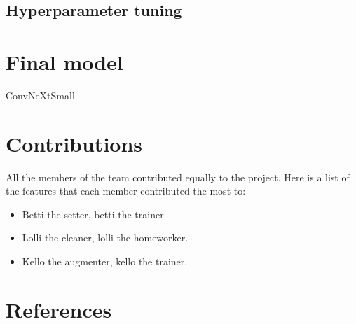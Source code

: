 \documentclass{article}
\begin{document}
\subsection{Hyperparameter tuning}


\section{Final model}
ConvNeXtSmall


\section{Contributions}

All the members of the team contributed equally to the project. Here is a list of the features that each member contributed the most to:
\begin{itemize}
    \item Betti the setter, betti the trainer.
    \item Lolli the cleaner, lolli the homeworker.
    \item Kello the augmenter, kello the trainer.
\end{itemize}




\section{References}
\end{document}
